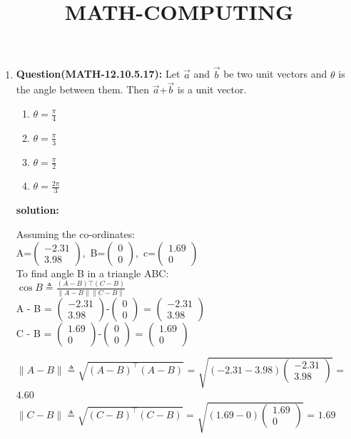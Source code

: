\documentclass[12pt]{article}
\newcommand{\norm}[1]{\lVert#1\rVert}
\providecommand{\brak}[1]{\ensuremath{\left(#1\right)}}
\newcommand{\myvec}[1]{\ensuremath{\begin{pmatrix}#1\end{pmatrix}}}
\begin{document}
\title{\textbf{MATH-COMPUTING}}
\maketitle
\begin{enumerate}
   
    \item \textbf{Question(MATH-12.10.5.17):}
    Let $\vec{a}$ and $\vec{b}$ be two unit vectors and $\theta$ is the angle between them. Then $\vec{a}$+$\vec{b}$ is a unit vector.
    
 \begin{enumerate}[label=(\Alph*)]                     
 \item $\theta=\frac{\pi}{4}$
 \item $\theta=\frac{\pi}{3}$
  \item $\theta=\frac{\pi}{2}$
   \item $\theta=\frac{2\pi}{3}$
   \end{enumerate}

 \textbf{solution:}

Assuming the co-ordinates:\\
{A}=\myvec{-2.31 \\ 3.98},\,
{B}=\myvec{0\\0},\,
{c}=\myvec{1.69\\0}\\

To find angle B in a triangle ABC:\\
$\cos{B} \triangleq \frac{({A}-{B})\top({C}-{B})}{\norm{{A}-{B}}\norm{{C}-{B}}}$\\

{A} - {B} = \myvec{-2.31 \\ 3.98}-\myvec{0 \\ 0} = \myvec{ -2.31\\ 3.98 }\\
{C} - {B} = \myvec{1.69 \\ 0}-\myvec{0 \\ 0} = \myvec{ 1.69\\ 0 }

$\norm{{A}-{B}} \triangleq \sqrt{\brak{{A}-{B}}^{\top}\brak{{A}-{B}}}$ = $\sqrt{\brak{{-2.31}-{3.98}}{\myvec{-2.31\\3.98}}}$ = $4.60$\\
$\norm{{C}-{B}} \triangleq \sqrt{\brak{{C}-{B}}^{\top}\brak{{C}-{B}}}$ = $\sqrt{\brak{{1.69}-{0}}{\myvec{1.69\\0}}}$ = $1.69$\\


\end{enumerate}
\end{document}
